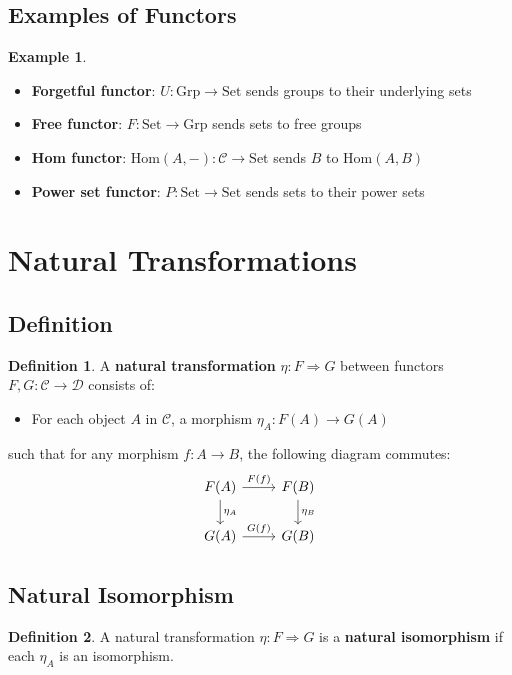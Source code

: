 \documentclass[11pt]{article}
\theoremstyle{definition}
\newtheorem{definition}{Definition}[section]
\newtheorem{example}{Example}[section]
\begin{document}
\subsection{Examples of Functors}
\begin{example}
\begin{itemize}
    \item \textbf{Forgetful functor}: $U: \text{Grp} \to \text{Set}$ sends groups to their underlying sets
    \item \textbf{Free functor}: $F: \text{Set} \to \text{Grp}$ sends sets to free groups
    \item \textbf{Hom functor}: $\text{Hom}(A,-): \mathcal{C} \to \text{Set}$ sends $B$ to $\text{Hom}(A,B)$
    \item \textbf{Power set functor}: $P: \text{Set} \to \text{Set}$ sends sets to their power sets
\end{itemize}
\end{example}

\section{Natural Transformations}

\subsection{Definition}
\begin{definition}
A \textbf{natural transformation} $\eta: F \Rightarrow G$ between functors $F, G: \mathcal{C} \to \mathcal{D}$ consists of:
\begin{itemize}
    \item For each object $A$ in $\mathcal{C}$, a morphism $\eta_A: F(A) \to G(A)$
\end{itemize}
such that for any morphism $f: A \to B$, the following diagram commutes:
$$\begin{tikzcd}
F(A) \arrow[r, "F(f)"] \arrow[d, "\eta_A"] & F(B) \arrow[d, "\eta_B"] \\
G(A) \arrow[r, "G(f)"] & G(B)
\end{tikzcd}$$
\end{definition}

\subsection{Natural Isomorphism}
\begin{definition}
A natural transformation $\eta: F \Rightarrow G$ is a \textbf{natural isomorphism} if each $\eta_A$ is an isomorphism.
\end{definition}
\end{document}
